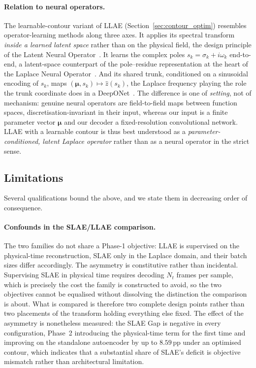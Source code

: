 ﻿\documentclass[a4paper,12pt]{article}
\theoremstyle{definition}
\theoremstyle{remark}
\newcommand{\vmu}{\bm{\mu}}
\begin{document}
\paragraph{Relation to neural operators.} The learnable-contour variant of LLAE (Section~\ref{sec:contour_optim}) resembles operator-learning methods along three axes. It applies its spectral transform \emph{inside a learned latent space} rather than on the physical field, the design principle of the Latent Neural Operator~\cite{wang2024lno}. It learns the complex poles $s_k = \sigma_k + i\omega_k$ end-to-end, a latent-space counterpart of the pole--residue representation at the heart of the Laplace Neural Operator~\cite{cao2023}. And its shared trunk, conditioned on a sinusoidal encoding of $s_k$, maps $(\vmu, s_k) \mapsto \hat{z}(s_k)$, the Laplace frequency playing the role the trunk coordinate does in a DeepONet~\cite{lu2021deeponet}. The difference is one of \emph{setting}, not of mechanism: genuine neural operators are field-to-field maps between function spaces, discretisation-invariant in their input, whereas our input is a finite parameter vector $\vmu$ and our decoder a fixed-resolution convolutional network. LLAE with a learnable contour is thus best understood as a \emph{parameter-conditioned, latent Laplace operator} rather than as a neural operator in the strict sense.

\subsection{Limitations}
\label{sec:limitations}

Several qualifications bound the above, and we state them in decreasing order of consequence.

\paragraph{Confounds in the SLAE/LLAE comparison.}
The two families do not share a Phase-1 objective: LLAE is supervised on the physical-time reconstruction, SLAE only in the Laplace domain, and their batch sizes differ accordingly. The asymmetry is constitutive rather than incidental. Supervising SLAE in physical time requires decoding $N_t$ frames per sample, which is precisely the cost the family is constructed to avoid, so the two objectives cannot be equalised without dissolving the distinction the comparison is about. What is compared is therefore two complete design points rather than two placements of the transform holding everything else fixed. The effect of the asymmetry is nonetheless measured: the SLAE Gap is negative in every configuration, Phase~2 introducing the physical-time term for the first time and improving on the standalone autoencoder by up to $8.59$\,pp under an optimised contour, which indicates that a substantial share of SLAE's deficit is objective mismatch rather than architectural limitation.
\end{document}
